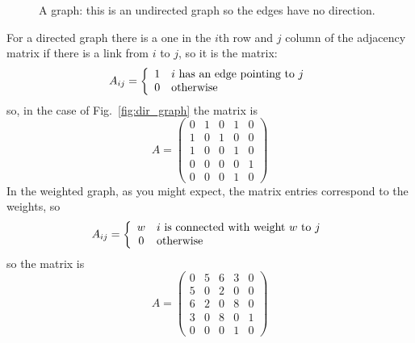 \documentclass[11pt,a4paper]{scrartcl}
\begin{document}
\begin{figure}
\begin{center}
\end{center}
\caption{A graph: this is an undirected graph so the edges have no
  direction. \label{fig:graph}}
\end{figure}

For a directed graph there is a one in the $i$th row and $j$ column of the adjacency matrix if there is a link from $i$ to $j$, so it is the matrix:
\begin{equation}
A_{ij}=\left\{\begin{array}{cl}1&i\mbox{ has an edge pointing to }j\cr0&\mbox{otherwise}
\end{array}\right.
\end{equation}
so, in the case of Fig.~\ref{fig:dir_graph} the matrix is 
\begin{equation}
A=\left(
\begin{array}{ccccc}
0&1&0&1&0\\
1&0&1&0&0\\
1&0&0&1&0\\
0&0&0&0&1\\
0&0&0&1&0
\end{array}
\right)
\end{equation}
In the weighted graph, as you might expect, the matrix entries correspond to the weights, so
\begin{equation}
A_{ij}=\left\{
\begin{array}{cl}
w&i\mbox{ is connected with weight }w\mbox{ to }j\cr 
0&\mbox{otherwise}
\end{array}\right.
\end{equation}
so the matrix is
\begin{equation}
A=\left(
\begin{array}{ccccc}
0&5&6&3&0\\
5&0&2&0&0\\
6&2&0&8&0\\
3&0&8&0&1\\
0&0&0&1&0
\end{array}
\right)
\end{equation}
\end{document}
